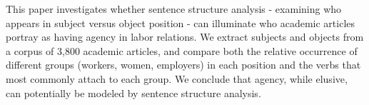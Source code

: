 This paper investigates whether sentence structure analysis - examining who appears in subject versus object position - can illuminate who academic articles portray as having agency in labor relations. We extract subjects and objects from a corpus of 3,800 academic articles,  and compare both the relative occurrence of different groups (workers, women, employers) in each position and the verbs that most commonly attach to each group. We conclude that agency, while elusive, can potentially be modeled by sentence structure analysis.
